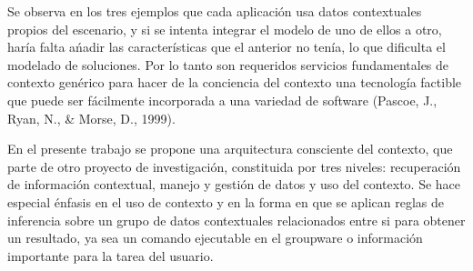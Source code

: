 Se observa en los tres ejemplos que cada aplicaci\'on usa datos contextuales propios del escenario, y si se intenta integrar el modelo de uno de ellos a otro, har\'ia falta a\'nadir las caracter\'isticas que el anterior no ten\'ia, lo que dificulta el modelado de soluciones. Por lo tanto son requeridos servicios fundamentales de contexto gen\'erico para hacer de la conciencia del contexto una tecnolog\'ia factible que puede ser f\'acilmente incorporada a una variedad de software (Pascoe, J., Ryan, N., \& Morse, D., 1999).

En el presente trabajo se propone una arquitectura consciente del contexto, que parte de otro proyecto de investigaci\'on\cite{montane2013context}, constituida por tres niveles: recuperaci\'on de informaci\'on contextual, manejo y gesti\'on de datos y uso del contexto. Se hace especial \'enfasis en el uso de contexto y en la forma en que se aplican reglas de inferencia sobre un grupo de datos contextuales relacionados entre si para obtener un resultado, ya sea un comando ejecutable en el groupware o informaci\'on importante para la tarea del usuario.


